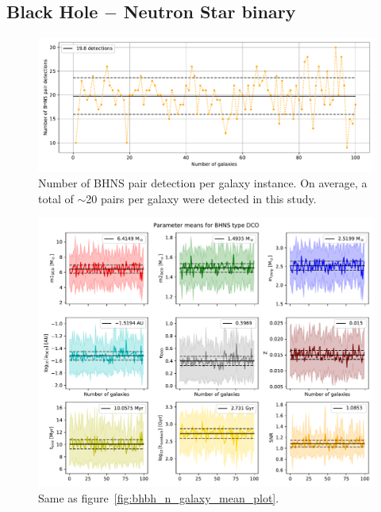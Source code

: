 \subsection{Black Hole $-$ Neutron Star binary}
\begin{figure}[!h]
	\centering
	\includegraphics[width=\columnwidth]{analysis_data/main_analysis_folder/BHNS_n_detections}
	\caption{Number of BHNS pair detection per galaxy instance. On average, a total of $\sim$20 pairs per galaxy were detected in this study.}
	\label{fig:bhnsndetections}
\end{figure}	

\begin{figure}[!h]
	\centering
	\includegraphics[width=\columnwidth]{analysis_data/main_analysis_folder/BHNS_n_galaxy_mean_plot}
	\caption{Same as figure~\ref{fig:bhbh_n_galaxy_mean_plot}.}
	\label{fig:bhns_n_galaxy_mean_plot}
\end{figure}
